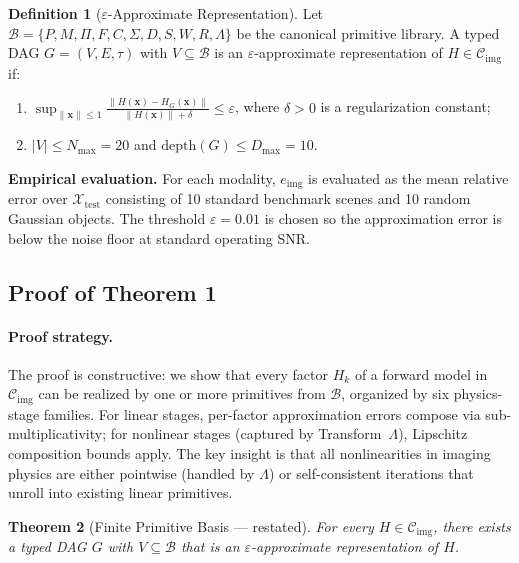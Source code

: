 \documentclass[11pt]{article}
\newtheorem{theorem}{Theorem}
\theoremstyle{definition}
\newtheorem{definition}[theorem]{Definition}
\begin{document}
\begin{definition}[$\varepsilon$-Approximate Representation]
\label{def:eps_supp}
Let $\mathcal{B} = \{P, M, \Pi, F, C, \Sigma, D, S, W, R, \Lambda\}$ be the canonical primitive library. A typed DAG $G = (V, E, \tau)$ with $V \subseteq \mathcal{B}$ is an $\varepsilon$-approximate representation of $H \in \mathcal{C}_{\mathrm{img}}$ if:
\begin{enumerate}
  \item $\displaystyle \sup_{\|\mathbf{x}\| \leq 1} \frac{\|H(\mathbf{x}) - H_G(\mathbf{x})\|}{\|H(\mathbf{x})\| + \delta} \leq \varepsilon$, where $\delta > 0$ is a regularization constant;
  \item $|V| \leq N_{\max} = 20$ and $\mathrm{depth}(G) \leq D_{\max} = 10$.
\end{enumerate}
\end{definition}

\noindent\textbf{Empirical evaluation.} For each modality, $e_{\mathrm{img}}$ is evaluated as the mean relative error over $\mathcal{X}_{\mathrm{test}}$ consisting of 10 standard benchmark scenes and 10 random Gaussian objects. The threshold $\varepsilon = 0.01$ is chosen so the approximation error is below the noise floor at standard operating SNR.

\subsection{Proof of Theorem 1}

\paragraph{Proof strategy.}
The proof is constructive: we show that every factor $H_k$ of a forward model in $\mathcal{C}_{\mathrm{img}}$ can be realized by one or more primitives from $\mathcal{B}$, organized by six physics-stage families. For linear stages, per-factor approximation errors compose via sub-multiplicativity; for nonlinear stages (captured by Transform~$\Lambda$), Lipschitz composition bounds apply. The key insight is that all nonlinearities in imaging physics are either pointwise (handled by $\Lambda$) or self-consistent iterations that unroll into existing linear primitives.

\begin{theorem}[Finite Primitive Basis --- restated]
For every $H \in \mathcal{C}_{\mathrm{img}}$, there exists a typed DAG $G$ with $V \subseteq \mathcal{B}$ that is an $\varepsilon$-approximate representation of $H$.
\end{theorem}
\end{document}
